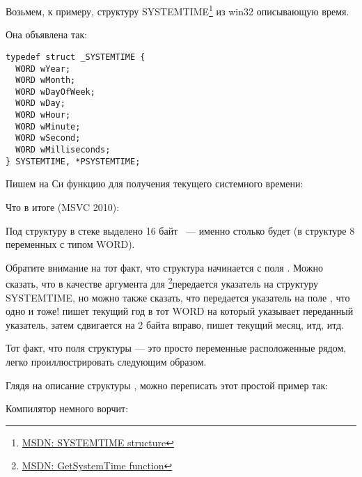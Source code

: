 \label{sec:SYSTEMTIME}

\newcommand{\FNSYSTEMTIME}{\footnote{\href{http://go.yurichev.com/17260}{MSDN: SYSTEMTIME structure}}}

Возьмем, к примеру, структуру SYSTEMTIME\FNSYSTEMTIME{} из win32 описывающую время.

Она объявлена так:

\begin{lstlisting}[caption=WinBase.h]
typedef struct _SYSTEMTIME {
  WORD wYear;
  WORD wMonth;
  WORD wDayOfWeek;
  WORD wDay;
  WORD wHour;
  WORD wMinute;
  WORD wSecond;
  WORD wMilliseconds;
} SYSTEMTIME, *PSYSTEMTIME;
\end{lstlisting}

Пишем на Си функцию для получения текущего системного времени:



Что в итоге (MSVC 2010):



Под структуру в стеке выделено 16 байт ~--- именно столько будет 
(в структуре 8 переменных с типом WORD).

\newcommand{\FNMSDNGST}{\footnote{\href{http://go.yurichev.com/17261}{MSDN: GetSystemTime function}}}

Обратите внимание на тот факт, что структура начинается с поля . 
Можно сказать, что в качестве аргумента для \FNMSDNGST передается указатель на структуру 
SYSTEMTIME, но можно также сказать, что передается указатель на поле , 
что одно и тоже! 
 пишет текущий год в тот WORD на который указывает переданный указатель, 
затем сдвигается на 2 байта вправо, пишет текущий месяц, итд, итд.




Тот факт, что поля структуры --- это просто переменные расположенные рядом, легко проиллюстрировать следующим образом.%

Глядя на описание структуры , можно переписать этот простой пример так:%



Компилятор немного ворчит:

